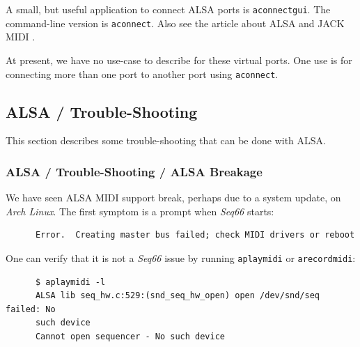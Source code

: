 %
%
%
%

   A small, but useful application to connect ALSA ports
   is \texttt{aconnectgui}. The command-line version is
   \texttt{aconnect}.
   Also see the article about ALSA and JACK MIDI \cite{midilinux}.

   At present, we have no use-case to describe
   for these virtual ports.
   One use is for connecting more than one port to another port
   using \texttt{aconnect}.

\subsection{ALSA / Trouble-Shooting}
\label{subsec:alsa_testing}

   This section describes some trouble-shooting that can be done with ALSA.

\subsubsection{ALSA / Trouble-Shooting / ALSA Breakage}
\label{subsubsec:alsa_testing_alsa_breakage}

   We have seen ALSA MIDI support break, perhaps due to a system update, on
   \textsl{Arch Linux}.
   The first symptom is a prompt when \textsl{Seq66} starts:

   \begin{verbatim}
      Error.  Creating master bus failed; check MIDI drivers or reboot
   \end{verbatim}

   One can verify that it is not a \textsl{Seq66} issue by running
   \texttt{aplaymidi} or \texttt{arecordmidi}:

   \begin{verbatim}
      $ aplaymidi -l
      ALSA lib seq_hw.c:529:(snd_seq_hw_open) open /dev/snd/seq failed: No
      such device
      Cannot open sequencer - No such device
   \end{verbatim}

